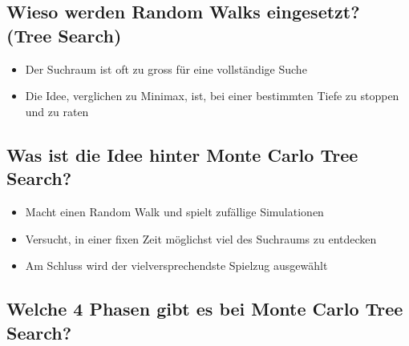 \documentclass[a4paper]{article}
\begin{document}
		\subsection{Wieso werden Random Walks eingesetzt? (Tree Search)}
		
		\begin{itemize}
			\item Der Suchraum ist oft zu gross für eine vollständige Suche
			\item Die Idee, verglichen zu Minimax, ist, bei einer bestimmten Tiefe zu stoppen und zu raten
		\end{itemize}
		
		\subsection{Was ist die Idee hinter Monte Carlo Tree Search?}
		
		\begin{itemize}
			\item Macht einen Random Walk und spielt zufällige Simulationen
			\item Versucht, in einer fixen Zeit möglichst viel des Suchraums zu entdecken
			\item Am Schluss wird der vielversprechendste Spielzug ausgewählt
		\end{itemize}
	
		\subsection{Welche 4 Phasen gibt es bei Monte Carlo Tree Search?}
		
\end{document}

